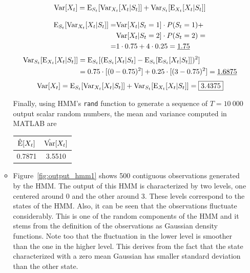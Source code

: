 \documentclass[a4paper]{article}
\begin{document}
\begin{itemize}
\begin{itemize}
	\begin{align*}
		{\rm Var}[X_t] = {\rm E}_{S_t}[ {\rm Var}_{X_t}[X_t|S_t] ] + 
			{\rm Var}_{S_t}[{\rm E}_{X_t}[X_t|S_t]]
	\end{align*}

	\begin{align*}
            {\rm E}_{S_t}[ {\rm Var}_{X_t}[X_t|S_t] ] =&
			{\rm Var}[X_t|S_t=1] \cdot P(S_t=1) + \\
                       &{\rm Var}[X_t|S_t=2] \cdot P(S_t=2) = \\
                        =& 1 \cdot 0.75 + 4 \cdot 0.25 = \underline{1.75}
	\end{align*}			
	\begin{align*}
		{\rm Var}_{S_t}[{\rm E}_{X_t}[X_t|S_t]] &=
		{\rm E}_{S_t}[ ( {\rm E}_{S_t}[X_t|S_t] - {\rm E}_{S_t}[{\rm E}_{S_t}[X_t|S_t]])^2 ] \\
		&= 0.75 \cdot [ (0-0.75)^2 ] + 0.25 \cdot [ (3-0.75)^2 ] = \underline{1.6875}
	\end{align*}
	\begin{align*}
		{\rm Var}[X_t] = {\rm E}_{S_t}[ {\rm Var}_{X_t}[X_t|S_t] ] + 
		{\rm Var}_{S_t}[{\rm E}_{X_t}[X_t|S_t]] = \framebox{3.4375}
	\end{align*}

	Finally, using HMM's \texttt{rand} function to generate a sequence of
	$T = 10~000$ output scalar random numbers, the mean and variance
	computed in MATLAB are


	\begin{center}
		\begin{tabular}{ | c | c | }
			\hline
			$\hat{{\rm E}}[X_t]$ & $\hat{{\rm Var}}[X_t]$ \\
			\hline
			0.7871 & 3.5510 \\
			\hline
		\end{tabular}
	\end{center}

	\item Figure~\ref{fig:output_hmm1} shows 500 contiguous observations
	generated by the HMM. The output of this HMM is characterized by two
	levels, one centered around 0 and the other around 3. These levels
	correspond to the states of the HMM. Also, it can be seen that the
	observations fluctuate considerably. This is one of the random
	components of the HMM and it stems from the definition of the
	observations as Gaussian density functions. Note too that the
	fluctuation in the lower level is smoother than the one in the higher
	level. This derives from the fact that the state characterized with a
        zero mean Gaussian has smaller standard deviation than the other state.


\end{itemize}
\end{itemize}
\end{document}
